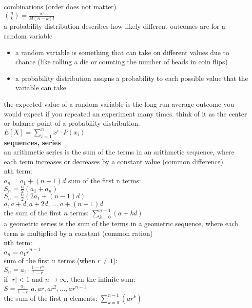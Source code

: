 \documentclass{article}
\begin{document}
combinations (order does not matter)\\
$\binom{n}{k} = \frac{n!}{k!(n - k)!}$\\

a probability distribution describes how likely different outcomes are for a random variable
	\begin{itemize}
		\item a random variable is something that can take on different values due to chance (like rolling a die or counting the number of heads in coin flips)
		\item a probability distribution assigns a probability to each possible value that the variable can take
	\end{itemize}

the expected value of a random variable is the long-run average outcome you would expect if you repeated an experiment many times. think of it as the center or balance point of a probability distribution.\\

$E[X] = \sum_{i=1}^{n} x^i \cdot P(x_i)$\\

\textbf{sequences, series}\\
an arithmetic series is the sum of the terms in an arithmetic sequence, where each term increases or decreases by a constant value (common difference)\\
nth term:\\
$a_n = a_1 + (n-1)d$
sum of the first n terms:\\
$S_n = \frac{n}{2}(a_1 + a_n)$\\
$S_n = \frac{n}{2}(2a_1 + (n-1)d)$\\
$a, a + d, a + 2d, \dots, a + (n - 1)d$\\
the sum of the first $n$ terms: $\sum_{k=0}^{n-1} (a + kd)$\\

a geometric series is the sum of the terms in a geometric sequence, where each term is multiplied by a constant (common ration)\\
nth term:\\
$a_n = a_1 \dot r^{n-1}$\\
sum of the first n terms (when $r \neq 1$):\\
$S_n = a_1 \cdot \frac{1 - r^n}{1 - r}$\\
if $\lvert r\rvert < 1$ and $n \to \infty$, then the infinite sum:\\
$S = \frac{a_1}{1 - r}$
$a, ar, ar^2, \dots, ar^{n-1}$\\
the sum of the first n elements: $\sum_{k=0}^{n-1} (ar^k)$\\
\end{document}
